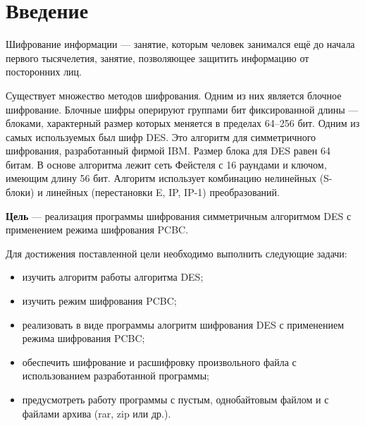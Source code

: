 \chapter*{Введение}

Шифрование информации --- занятие, которым человек занимался ещё до начала первого тысячелетия, занятие, позволяющее защитить информацию от посторонних лиц. 

Существует множество методов шифрования. Одним из них является блочное шифрование. Блочные шифры оперируют группами бит фиксированной длины --- блоками, характерный размер которых меняется в пределах 64--256 бит. Одним из самых используемых был шифр DES. Это алгоритм для симметричного шифрования, разработанный фирмой IBM. Размер блока для DES равен 64 битам. В основе алгоритма лежит сеть Фейстеля с 16 раундами и ключом, имеющим длину 56 бит. Алгоритм использует комбинацию нелинейных (S-блоки) и линейных (перестановки E, IP, IP-1) преобразований.

\textbf{Цель} --- реализация программы шифрования симметричным алгоритмом DES с применением режима шифрования PCBC.

Для достижения поставленной цели необходимо выполнить следующие задачи:
\begin{itemize}[label=---]
	\item изучить алгоритм работы алгоритма DES;
	\item изучить режим шифрования PCBC;
	\item реализовать в виде программы алогритм шифрования DES с применением режима шифрования PCBC;
	\item обеспечить шифрование и расшифровку произвольного файла с использованием разработанной программы;
	\item предусмотреть работу программы с пустым, однобайтовым файлом и с файлами архива (rar, zip или др.).
\end{itemize}


